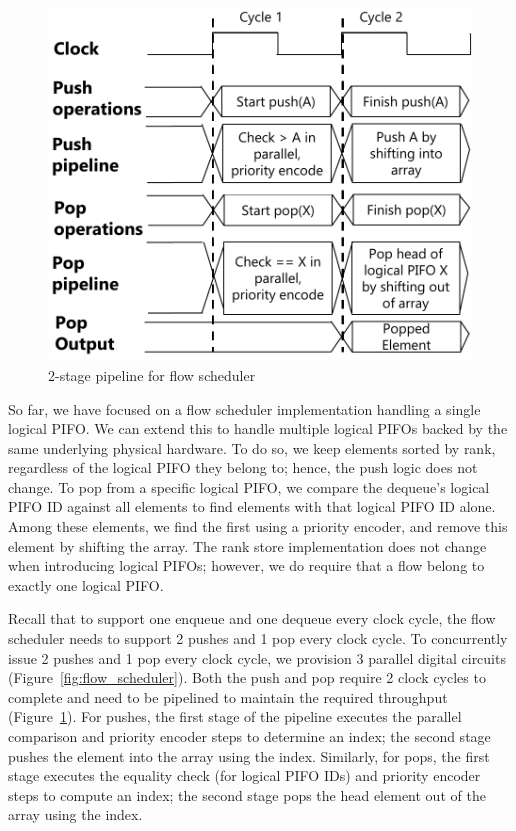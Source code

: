 \begin{figure}[!t]
  \centering
  \includegraphics[width=0.6\columnwidth]{pifo_2stage_pipeline.pdf}
  \caption{2-stage pipeline for flow scheduler}
  \label{fig:2stage}
\end{figure}



So far, we have focused on a flow scheduler implementation handling a single
logical PIFO. We can extend this to handle multiple logical PIFOs backed by the
same underlying physical hardware. To do so, we keep elements sorted by rank,
regardless of the logical PIFO they belong to; hence, the push logic does not
change.  To pop from a specific logical PIFO, we compare the dequeue's logical
PIFO ID against all elements to find elements with that logical PIFO ID alone.
Among these elements, we find the first using a priority encoder, and remove
this element by shifting the array.  The rank store implementation does not
change when introducing logical PIFOs; however, we do require that a flow
belong to exactly one logical PIFO.

Recall that to support one enqueue and one dequeue every clock cycle, the flow
scheduler needs to support 2 pushes and 1 pop every clock cycle. To concurrently
issue 2 pushes and 1 pop every clock cycle, we provision 3 parallel digital circuits
(Figure~\ref{fig:flow_scheduler}). Both the push and pop require 2 clock cycles to
complete and need to be pipelined to maintain the required throughput
(Figure~\ref{fig:2stage}). For pushes, the first stage of the pipeline executes
the parallel comparison and priority encoder steps to determine an index; the
second stage pushes the element into the array using the index.  Similarly, for
pops, the first stage executes the equality check (for logical PIFO IDs) and
priority encoder steps to compute an index; the second stage pops the head
element out of the array using the index.

